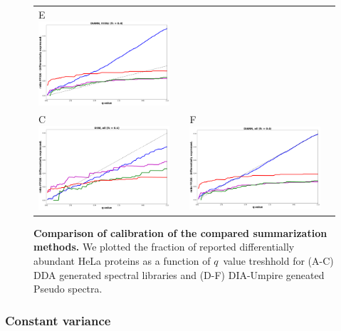 \documentclass[10pt,letterpaper]{article}
\begin{document}
\begin{figure}[hbt]
\begin{tabular}{lclc}
        E \includegraphics[width=0.5\linewidth]{../../result/report_plots/diann_FP_DE_ecoli.png} & \\%
        C \includegraphics[width=0.5\linewidth]{../../result/report_plots/osw_FP_DE_all.png} & &%
        F \includegraphics[width=0.5\linewidth]{../../result/report_plots/diann_FP_DE_all.png} & \\%
    \end{tabular}
  \caption{{\bf Comparison of calibration of the compared summarization methods.} We plotted the fraction of reported differentially abundant HeLa proteins as a function of $q$~value treshhold for (A-C) DDA generated spectral libraries and (D-F) DIA-Umpire geneated Pseudo spectra. \label{fig:frac_hela_vs_fdr}}
\end{figure}


\subsubsection*{Constant variance}
\end{document}
